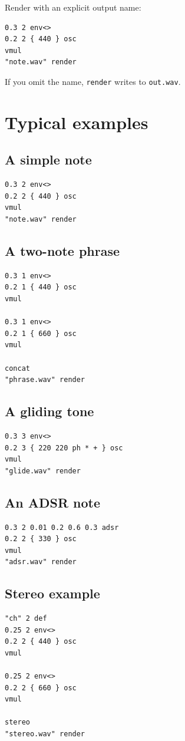 \documentclass[11pt]{article}
\begin{document}
Render with an explicit output name:
\begin{lstlisting}
0.3 2 env<>
0.2 2 { 440 } osc
vmul
"note.wav" render
\end{lstlisting}

If you omit the name, \texttt{render} writes to \texttt{out.wav}.

\section*{Typical examples}
\subsection*{A simple note}
\begin{lstlisting}
0.3 2 env<>
0.2 2 { 440 } osc
vmul
"note.wav" render
\end{lstlisting}

\subsection*{A two-note phrase}
\begin{lstlisting}
0.3 1 env<>
0.2 1 { 440 } osc
vmul

0.3 1 env<>
0.2 1 { 660 } osc
vmul

concat
"phrase.wav" render
\end{lstlisting}

\subsection*{A gliding tone}
\begin{lstlisting}
0.3 3 env<>
0.2 3 { 220 220 ph * + } osc
vmul
"glide.wav" render
\end{lstlisting}

\subsection*{An ADSR note}
\begin{lstlisting}
0.3 2 0.01 0.2 0.6 0.3 adsr
0.2 2 { 330 } osc
vmul
"adsr.wav" render
\end{lstlisting}

\subsection*{Stereo example}
\begin{lstlisting}
"ch" 2 def
0.25 2 env<>
0.2 2 { 440 } osc
vmul

0.25 2 env<>
0.2 2 { 660 } osc
vmul

stereo
"stereo.wav" render
\end{lstlisting}
\end{document}

